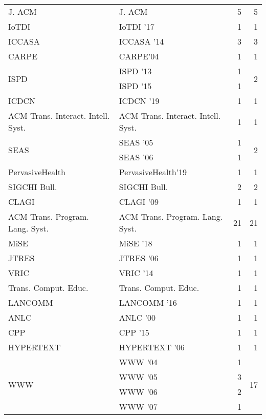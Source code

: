 \begin{table*}[t]
\begin{tabular}{llrr}
\multirow{1}{*}{J. ACM} & J. ACM & 5 & \multirow{1}{*}{5}\\
\multirow{1}{*}{IoTDI } & IoTDI '17 & 1 & \multirow{1}{*}{1}\\
\multirow{1}{*}{ICCASA } & ICCASA '14 & 3 & \multirow{1}{*}{3}\\
\multirow{1}{*}{CARPE} & CARPE'04 & 1 & \multirow{1}{*}{1}\\
\multirow{2}{*}{ISPD } & ISPD '13 & 1 & \multirow{2}{*}{2}\\
& ISPD '15 & 1 &\\
\multirow{1}{*}{ICDCN } & ICDCN '19 & 1 & \multirow{1}{*}{1}\\
\multirow{1}{*}{ACM Trans. Interact. Intell. Syst.} & ACM Trans. Interact. Intell. Syst. & 1 & \multirow{1}{*}{1}\\
\multirow{2}{*}{SEAS } & SEAS '05 & 1 & \multirow{2}{*}{2}\\
& SEAS '06 & 1 &\\
\multirow{1}{*}{PervasiveHealth} & PervasiveHealth'19 & 1 & \multirow{1}{*}{1}\\
\multirow{1}{*}{SIGCHI Bull.} & SIGCHI Bull. & 2 & \multirow{1}{*}{2}\\
\multirow{1}{*}{CLAGI } & CLAGI '09 & 1 & \multirow{1}{*}{1}\\
\multirow{1}{*}{ACM Trans. Program. Lang. Syst.} & ACM Trans. Program. Lang. Syst. & 21 & \multirow{1}{*}{21}\\
\multirow{1}{*}{MiSE } & MiSE '18 & 1 & \multirow{1}{*}{1}\\
\multirow{1}{*}{JTRES } & JTRES '06 & 1 & \multirow{1}{*}{1}\\
\multirow{1}{*}{VRIC } & VRIC '14 & 1 & \multirow{1}{*}{1}\\
\multirow{1}{*}{Trans. Comput. Educ.} & Trans. Comput. Educ. & 1 & \multirow{1}{*}{1}\\
\multirow{1}{*}{LANCOMM } & LANCOMM '16 & 1 & \multirow{1}{*}{1}\\
\multirow{1}{*}{ANLC } & ANLC '00 & 1 & \multirow{1}{*}{1}\\
\multirow{1}{*}{CPP } & CPP '15 & 1 & \multirow{1}{*}{1}\\
\multirow{1}{*}{HYPERTEXT } & HYPERTEXT '06 & 1 & \multirow{1}{*}{1}\\
\multirow{12}{*}{WWW } & WWW '04 & 1 & \multirow{12}{*}{17}\\
& WWW '05 & 3 &\\
& WWW '06 & 2 &\\
& WWW '07 & 1 &\\

\end{tabular}
\end{table*}
